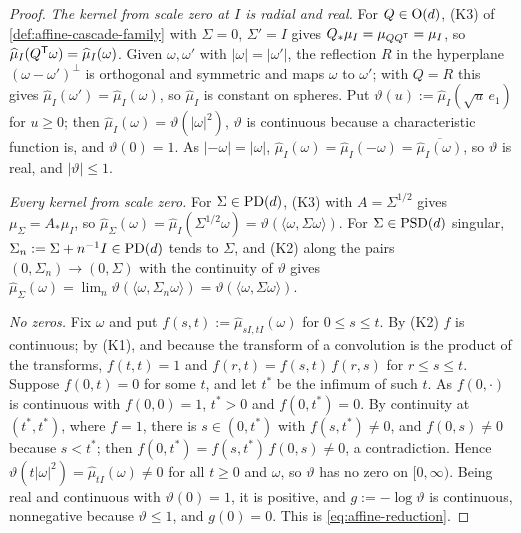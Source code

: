\begin{proof}
\leanok
\emph{The kernel from scale zero at $I$ is radial and real.} For $Q \in \mathrm{O}(d)$, (K3) of
\ref{def:affine-cascade-family} with $\Sigma = 0$,
$\Sigma' = I$ gives $Q_*\mu_I = \mu_{QQ^{\mathsf{T}}} = \mu_I$, so
$\widehat\mu_I(Q^{\mathsf{T}}\omega) = \widehat\mu_I(\omega)$. Given $\omega, \omega'$ with
$|\omega| = |\omega'|$, the reflection $R$ in the hyperplane $(\omega - \omega')^\perp$ is
orthogonal and symmetric and maps $\omega$ to $\omega'$; with $Q = R$ this gives
$\widehat\mu_I(\omega') = \widehat\mu_I(\omega)$, so $\widehat\mu_I$ is constant on spheres.
Put $\vartheta(u) := \widehat\mu_I(\sqrt u\,e_1)$ for $u \ge 0$; then
$\widehat\mu_I(\omega) = \vartheta(|\omega|^2)$, $\vartheta$ is continuous because a characteristic
function is, and $\vartheta(0) = 1$. As $|-\omega| = |\omega|$,
$\widehat\mu_I(\omega) = \widehat\mu_I(-\omega) = \overline{\widehat\mu_I(\omega)}$, so $\vartheta$ is
real, and $|\vartheta| \le 1$.

\emph{Every kernel from scale zero.} For $\Sigma \in \mathrm{PD}(d)$, (K3) with $A = \Sigma^{1/2}$ gives
$\mu_\Sigma = A_*\mu_I$, so $\widehat\mu_\Sigma(\omega) = \widehat\mu_I(\Sigma^{1/2}\omega)
= \vartheta(\langle\omega,\Sigma\omega\rangle)$. For $\Sigma \in \mathrm{PSD}(d)$ singular,
$\Sigma_n := \Sigma + n^{-1}I \in \mathrm{PD}(d)$ tends to $\Sigma$, and (K2) along the pairs
$(0,\Sigma_n) \to (0,\Sigma)$ with the continuity of $\vartheta$ gives
$\widehat\mu_\Sigma(\omega) = \lim_n\vartheta(\langle\omega,\Sigma_n\omega\rangle)
= \vartheta(\langle\omega,\Sigma\omega\rangle)$.

\emph{No zeros.} Fix $\omega$ and put $f(s,t) := \widehat\mu_{sI,tI}(\omega)$ for $0 \le s \le t$.
By (K2) $f$ is continuous; by (K1), and because the transform of a convolution is the product of
the transforms, $f(t,t) = 1$ and $f(r,t) = f(s,t)\,f(r,s)$ for $r \le s \le t$. Suppose
$f(0,t) = 0$ for some $t$, and let $t^*$ be the infimum of such $t$. As $f(0,\cdot)$ is continuous
with $f(0,0) = 1$, $t^* > 0$ and $f(0,t^*) = 0$. By continuity at $(t^*,t^*)$, where $f = 1$, there
is $s \in (0,t^*)$ with $f(s,t^*) \ne 0$, and $f(0,s) \ne 0$ because $s < t^*$; then
$f(0,t^*) = f(s,t^*)\,f(0,s) \ne 0$, a contradiction. Hence
$\vartheta(t|\omega|^2) = \widehat\mu_{tI}(\omega) \ne 0$ for all $t \ge 0$ and $\omega$, so $\vartheta$
has no zero on $[0,\infty)$. Being real and continuous with $\vartheta(0) = 1$, it is positive, and
$g := -\log\vartheta$ is continuous, nonnegative because $\vartheta \le 1$, and $g(0) = 0$. This is
\ref{eq:affine-reduction}.


\end{proof}
